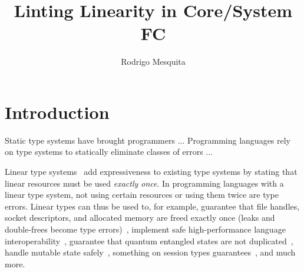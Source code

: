 \documentclass[]{lwnovathesis}
\title{Linting Linearity in Core/System FC}
\author{Rodrigo Mesquita}
\begin{document}
\frontmatter

\maketitle
\tableofcontents

\mainmatter


\chapter{Introduction}




Static type systems have brought programmers ...
Programming languages rely on type systems to statically eliminate classes of
errors ...

Linear type systems~\cite{} add expressiveness to existing type systems by
stating that linear resources must be used \emph{exactly once}. In programming
languages with a linear type system, not using certain resources or using them
twice are type errors. Linear types can thus be used to, for example, guarantee
that file handles, socket descriptors, and allocated memory are freed exactly
once (leaks and double-frees become type errors)~\cite{}, implement safe
high-performance language interoperability~\cite{}, guarantee that quantum
entangled states are not duplicated~\cite{}, handle mutable state safely~\cite{},
something on session types guarantees~\cite{}, and much more.

\end{document}
